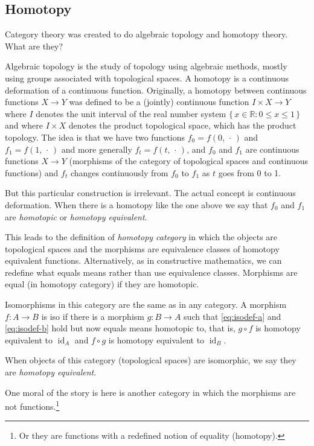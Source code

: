 \documentclass[11pt]{article}
\DeclareMathOperator{\idfun}{id}
\newcommand{\set}[1]{\{\,#1\,\}}
\newcommand{\real}{\mathbb{R}}
\newcommand{\fatdot}{\,\cdot\,}
\begin{document}
\subsection{Homotopy}
\label{sec:homotopy}

Category theory was created \citep{eilenberg-maclane}
to do algebraic topology and homotopy theory.
What are they?

Algebraic topology is the study of topology using algebraic methods,
mostly using groups associated with topological spaces.
A homotopy is a continuous deformation of a continuous function.
Originally, a homotopy between continuous functions $X \to Y$ was defined to be
a (jointly) continuous
function $I \times X \to Y$ where $I$ denotes the unit interval
of the real number system $\set{x \in \real : 0 \le x \le 1}$ and where
$I \times X$ denotes the product topological space, which has the product
topology.
The idea is that we have two functions $f_0 = f(0, \fatdot)$
and $f_1 = f(1, \fatdot)$
and more generally $f_t = f(t, \fatdot)$, and $f_0$ and $f_1$ are
continuous functions $X \to Y$ (morphisms of the category of topological
spaces and continuous functions) and $f_t$ changes continuously from $f_0$
to $f_1$ as $t$ goes from 0 to 1.

But this particular construction is irrelevant.  The actual concept is
continuous deformation.  When there is a homotopy like the one above we
say that $f_0$ and $f_1$ are \emph{homotopic} or \emph{homotopy equivalent}.

This leads to the definition of \emph{homotopy category} in which the
objects are topological spaces and the morphisms are equivalence classes
of homotopy equivalent functions.
Alternatively, as in constructive mathematics, we can redefine what equals
means rather than use equivalence classes.  Morphisms are equal (in homotopy
category) if they are homotopic.

Isomorphisms in this category are the same as in any category.  A morphism
$f : A \to B$ is iso if there is a morphism $g : B \to A$ such that
\eqref{eq:isodef-a} and \eqref{eq:isodef-b} hold but now equals means
homotopic to, that is, $g \circ f$ is homotopy equivalent to $\idfun_A$
and $f \circ g$ is homotopy equivalent to $\idfun_B$.

When objects of this category (topological spaces) are isomorphic,
we say they are \emph{homotopy equivalent}.

One moral of the story is here is another category in which the morphisms
are not functions.\footnote{Or they are functions with a redefined notion
of equality (homotopy).}
\end{document}
